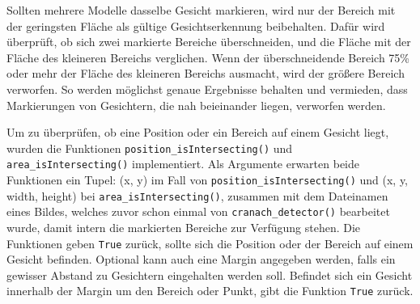Sollten mehrere Modelle dasselbe Gesicht markieren, wird nur der Bereich mit der geringsten Fläche als gültige Gesichtserkennung beibehalten. Dafür wird überprüft, ob sich zwei markierte Bereiche überschneiden, und die Fläche mit der Fläche des kleineren Bereichs verglichen. Wenn der überschneidende Bereich 75\% oder mehr der Fläche des kleineren Bereichs ausmacht, wird der größere Bereich verworfen. So werden möglichst genaue Ergebnisse behalten und vermieden, dass Markierungen von Gesichtern, die nah beieinander liegen, verworfen werden.

Um zu überprüfen, ob eine Position oder ein Bereich auf einem Gesicht liegt, wurden die Funktionen \texttt{position\_isIntersecting()} und \texttt{area\_isIntersecting()} implementiert. Als Argumente erwarten beide Funktionen ein Tupel: (x, y) im Fall von \texttt{position\_isIntersecting()} und (x, y, width, height) bei \texttt{area\_isIntersecting()}, zusammen mit dem Dateinamen eines Bildes, welches zuvor schon einmal von \texttt{cranach\_detector()} bearbeitet wurde, damit intern die markierten Bereiche zur Verfügung stehen. Die Funktionen geben \texttt{True} zurück, sollte sich die Position oder der Bereich auf einem Gesicht befinden.  
Optional kann auch eine Margin angegeben werden, falls ein gewisser Abstand zu Gesichtern eingehalten werden soll. Befindet sich ein Gesicht innerhalb der Margin um den Bereich oder Punkt, gibt die Funktion \texttt{True} zurück.